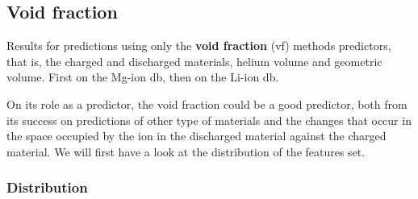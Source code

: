 






\FloatBarrier
\subsection{Void fraction}
Results for predictions using only the \textbf{void fraction} (\ac{vf}) methods predictors, that is, the charged and discharged materials, helium volume and geometric volume. First on the Mg-ion db, then on the Li-ion db.

	On its role as a predictor, the void fraction could be a good predictor, both from its success on predictions of other type of materials and the changes that occur in the space occupied by the ion in the discharged material against the charged material. We will first have a look at the distribution of the features set. 

\subsubsection{Distribution}


